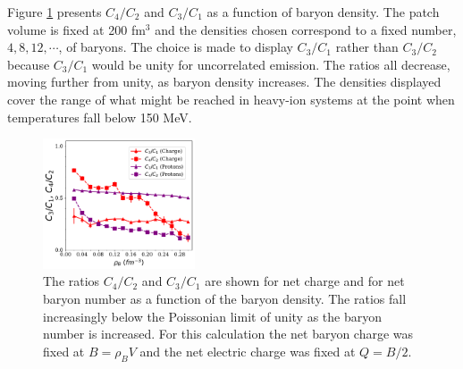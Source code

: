 Figure \ref{fig:uniform_vs_rho_fixedQ} presents $C_4/C_2$ and $C_3/C_1$ as a function of baryon density. The patch volume is fixed at 200 fm$^3$ and the densities chosen correspond to a fixed number, $4,8,12, \cdots$, of baryons. The choice is made to display $C_3/C_1$ rather than $C_3/C_2$ because $C_3/C_1$ would be unity for uncorrelated emission. The ratios all decrease, moving further from unity, as baryon density increases. The densities displayed cover the range of what might be reached in heavy-ion systems at the point when temperatures fall below 150 MeV.
\begin{figure}
\centerline{\includegraphics[width=0.4\textwidth]{figs/m_vs_rho_fixedQ}}
\caption{\label{fig:uniform_vs_rho_fixedQ}
The ratios $C_4/C_2$ and $C_3/C_1$ are shown for net charge and for net baryon number as a function of the baryon density. The ratios fall increasingly below the Poissonian limit of unity as the baryon number is increased. For this calculation the net baryon charge was fixed at $B=\rho_BV$ and the net electric charge was fixed at $Q=B/2$.}
\end{figure}

